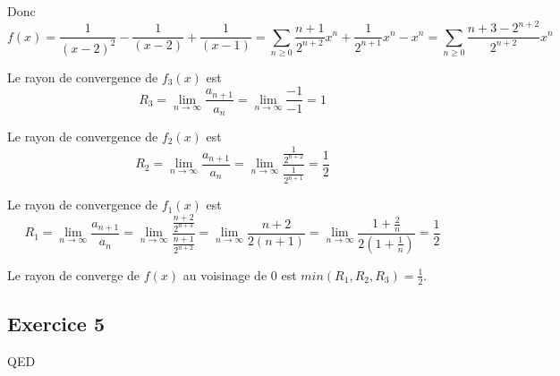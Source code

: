 \documentclass[]{book}
\theoremstyle{definition}
\begin{document}
Donc 
$$
f(x) = \frac{1}{(x-2)^2} -\frac{1}{(x-2)} + \frac{1}{(x-1)} = \sum_{n \ge 0} \frac{n+1}{2^{n+2}}x^n + \frac{1}{2^{n+1}}x^n -x^n = \sum_{n \ge 0} \frac{n+3-2^{n+2}}{2^{n+2}}x^n
$$ 


Le rayon de convergence de $f_3(x)$ est 
$$R_3 = \lim_{n \to \infty} \frac{a_{n+1}}{a_n} = \lim_{n \to \infty} \frac{-1}{-1} = 1$$

Le rayon de convergence de $f_2(x)$ est 
$$R_2 = \lim_{n \to \infty} \frac{a_{n+1}}{a_n} = \lim_{n \to \infty} \frac{\frac{1}{2^{n+2}}}{\frac{1}{2^{n+1}}} = \frac{1}{2}$$

Le rayon de convergence de $f_1(x)$ est 
$$R_1 = \lim_{n \to \infty} \frac{a_{n+1}}{a_n} = \lim_{n \to \infty} \frac{\frac{n+2}{2^{n+3}}}{\frac{n+1}{2^{n+2}}} = \lim_{n \to \infty} \frac{n+2}{2(n+1)} = \lim_{n \to \infty} \frac{1+\frac{2}{n}}{2(1+\frac{1}{n})} = \frac{1}{2}$$

Le rayon de converge de $f(x)$ au voisinage de 0 est $min(R_1, R_2, R_3) = \frac{1}{2}$.

\subsection*{Exercice 5}


QED
\end{document}
